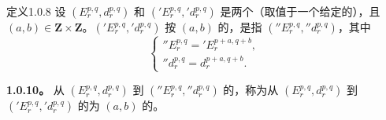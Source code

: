 \begin{SGAresult}{定义}{1.0.8}
设 $(E_r^{p,q},d_r^{p,q})$ 和 $('E_r^{p,q},'d_r^{p,q})$ 是两个（取值于一个给定的），且 $(a,b)\in\mathbf Z\times\mathbf Z$。$('E_r^{p,q},'d_r^{p,q})$ 按 $(a,b)$ 的，是指 $(''E_r^{p,q},''d_r^{p,q})$，其中
\begin{equation}\tag{1.0.9}
\begin{cases}
''E_r^{p,q}='E_r^{p+a,q+b},\\
''d_r^{p,q}=d_r^{p+a,q+b}.
\end{cases}
\end{equation}
\end{SGAresult}
\textbf{1.0.10。} 从 $(E_r^{p,q},d_r^{p,q})$ 到 $(''E_r^{p,q},''d_r^{p,q})$ 的，称为从 $(E_r^{p,q},d_r^{p,q})$ 到 $('E_r^{p,q},'d_r^{p,q})$ 的为 $(a,b)$ 的。


